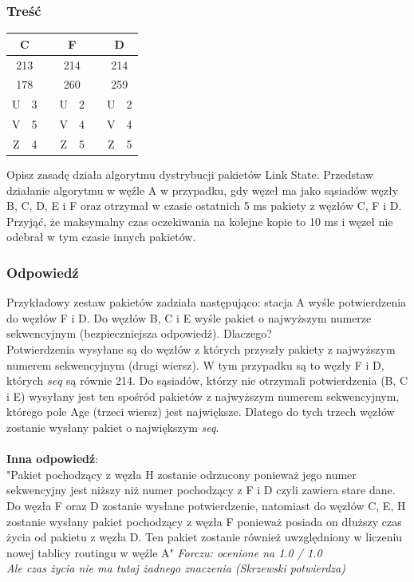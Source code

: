 \documentclass[a4paper,twoside]{article}
\begin{document}
\subsubsection{Treść}
\begin{table}
	\begin{tabular}{|c|c|c|c|c|c|c|c|}
		\hline \multicolumn{2}{|c|}{\textbf{C}}  & & \multicolumn{2}{|c|}{\textbf{F}} & & \multicolumn{2}{|c|}{\textbf{D}}\\ 
		\hline \multicolumn{2}{|c|}{213} & &\multicolumn{2}{|c|}{214} & &\multicolumn{2}{|c|}{214} \\ 
		\hline \multicolumn{2}{|c|}{178} & &\multicolumn{2}{|c|}{260} & &\multicolumn{2}{|c|}{259}   \\ 
		\hline U & 3 & & U & 2 & & U & 2\\ 
		\hline V & 5 & & V & 4 & & V & 4\\
		\hline Z & 4 & & Z & 5 & & Z & 5\\
		\hline 
	\end{tabular}
\end{table}
Opisz zasadę działa algorytmu dystrybucji pakietów Link State. Przedstaw działanie algorytmu w węźle A w przypadku, gdy węzeł ma jako sąsiadów węzły B, C, D, E i F oraz otrzymał w czasie ostatnich 5 ms pakiety z węzłów C, F i D. Przyjąć, że maksymalny czas oczekiwania na kolejne kopie to 10 ms i węzeł nie odebrał w tym czasie innych pakietów.\\

\subsubsection{Odpowiedź}

Przykładowy zestaw pakietów zadziała następująco: stacja A wyśle potwierdzenia do węzłów F i D. Do węzłów B, C i E wyśle pakiet o najwyższym numerze sekwencyjnym (bezpieczniejsza odpowiedź). Dlaczego?\\
Potwierdzenia wysyłane są do węzłów z których przyszły pakiety z najwyższym numerem sekwencyjnym (drugi wiersz). W tym przypadku są to węzły F i D, których $ seq $ są równie 214. Do sąsiadów, którzy nie otrzymali potwierdzenia (B, C i E) wysyłany jest ten spośród pakietów z najwyższym numerem sekwencyjnym, którego pole Age (trzeci wiersz) jest największe. Dlatego do tych trzech węzłów zostanie wysłany pakiet o największym \emph{seq}.\\\\
\textbf{Inna odpowiedź}:\\
"Pakiet pochodzący z węzła H zostanie odrzucony ponieważ jego numer sekwencyjny jest niższy niż numer pochodzący z F i D czyli zawiera stare dane. Do węzła F oraz D zostanie wysłane potwierdzenie, natomiast do węzłów C, E, H zostanie wysłany pakiet pochodzący z węzła F ponieważ posiada on dłuższy czas życia od pakietu z węzła D. Ten pakiet zostanie również uwzględniony w liczeniu nowej tablicy routingu w węźle A"
{\small \emph{Forczu: ocenione na 1.0 / 1.0\\
		Ale czas życia nie ma tutaj żadnego znaczenia (Skrzewski potwierdza)}}
\newpage
\end{document}
